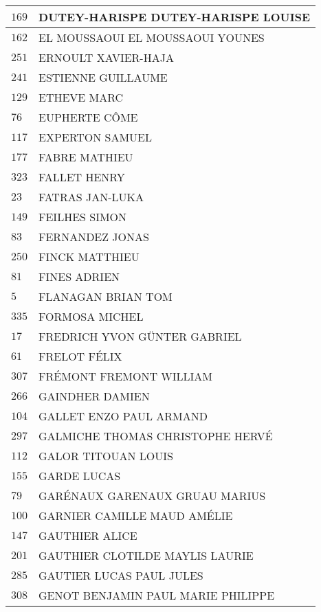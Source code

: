 \begin{xltabular}{\linewidth}{|l|X|}
    \hline
    $169$ & DUTEY-HARISPE DUTEY-HARISPE LOUISE \\
    \hline
    $162$ & EL MOUSSAOUI EL MOUSSAOUI YOUNES \\
    \hline
    $251$ & ERNOULT XAVIER-HAJA \\
    \hline
    $241$ & ESTIENNE GUILLAUME \\
    \hline
    $129$ & ETHEVE MARC \\
    \hline
    $76$ & EUPHERTE CÔME \\
    \hline
    $117$ & EXPERTON SAMUEL \\
    \hline
    $177$ & FABRE MATHIEU \\
    \hline
    $323$ & FALLET HENRY \\
    \hline
    $23$ & FATRAS JAN-LUKA \\
    \hline
    $149$ & FEILHES SIMON \\
    \hline
    $83$ & FERNANDEZ JONAS \\
    \hline
    $250$ & FINCK MATTHIEU \\
    \hline
    $81$ & FINES ADRIEN \\
    \hline
    $5$ & FLANAGAN BRIAN TOM \\
    \hline
    $335$ & FORMOSA MICHEL \\
    \hline
    $17$ & FREDRICH YVON GÜNTER GABRIEL \\
    \hline
    $61$ & FRELOT FÉLIX \\
    \hline
    $307$ & FRÉMONT FREMONT WILLIAM \\
    \hline
    $266$ & GAINDHER DAMIEN \\
    \hline
    $104$ & GALLET ENZO PAUL ARMAND \\
    \hline
    $297$ & GALMICHE THOMAS CHRISTOPHE HERVÉ \\
    \hline
    $112$ & GALOR TITOUAN LOUIS \\
    \hline
    $155$ & GARDE LUCAS \\
    \hline
    $79$ & GARÉNAUX GARENAUX GRUAU MARIUS \\
    \hline
    $100$ & GARNIER CAMILLE MAUD AMÉLIE \\
    \hline
    $147$ & GAUTHIER ALICE \\
    \hline
    $201$ & GAUTHIER CLOTILDE MAYLIS LAURIE \\
    \hline
    $285$ & GAUTIER LUCAS PAUL JULES \\
    \hline
    $308$ & GENOT BENJAMIN PAUL MARIE PHILIPPE \\
    \hline

\end{xltabular}
